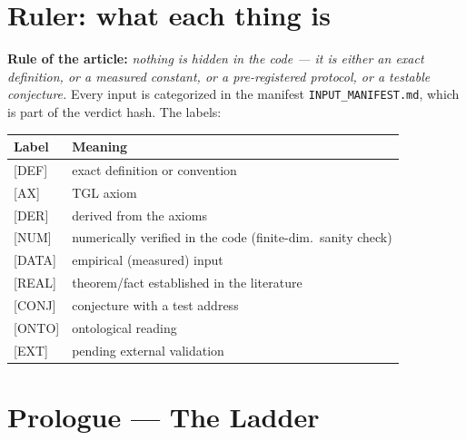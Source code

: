 \documentclass[11pt]{article}
\theoremstyle{definition}\newtheorem{deriv}{Derivation}
\begin{document}
\clearpage\tableofcontents\clearpage

\section*{Ruler: what each thing is}

\noindent\textbf{Rule of the article:} \emph{nothing is hidden in the code --- it is either an exact definition, or a measured constant, or a pre-registered protocol, or a testable conjecture.} Every input is categorized in the manifest \texttt{INPUT\_MANIFEST.md}, which is part of the verdict hash. The labels:

\begin{center}\small\begin{tabular}{ll}\toprule

Label & Meaning\\\midrule

\textsf{[DEF]} & exact definition or convention\\

\textsf{[AX]} & TGL axiom\\

\textsf{[DER]} & derived from the axioms\\

\textsf{[NUM]} & numerically verified in the code (finite-dim.\ sanity check)\\

\textsf{[DATA]} & empirical (measured) input\\

\textsf{[REAL]} & theorem/fact established in the literature\\

\textsf{[CONJ]} & conjecture with a test address\\

\textsf{[ONTO]} & ontological reading\\

\textsf{[EXT]} & pending external validation\\\bottomrule

\end{tabular}\end{center}

\section*{Prologue --- The Ladder}
\end{document}
